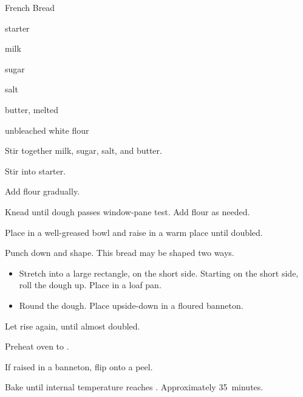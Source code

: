 \begin{recipe}{French Bread}{}{}

\begin{ingredients}
\item {} starter
\item \C{\half} milk
\item {} sugar
\item {} salt
\item {} butter, melted
\item {} unbleached white flour
\end{ingredients}

\begin{directions}
\item Stir together milk, sugar, salt, and butter.
\item Stir into starter.
\item Add flour gradually.
\item Knead until dough passes window-pane test. Add flour as needed.
\item Place in a well-greased bowl and raise in a warm place until doubled.
\item Punch down and shape.
This bread may be shaped two ways.
\begin{itemize}
\item Stretch into a large rectangle,  on the short side. Starting on the short side, roll the dough up. Place in a loaf pan.
\item Round the dough. Place upside-down in a floured banneton.
\end{itemize}
\item Let rise again, until almost doubled.
\item Preheat oven to .
\item If raised in a banneton, flip onto a peel.
\item Bake until internal temperature reaches . Approximately 35~minutes.
\end{directions}

\end{recipe}

